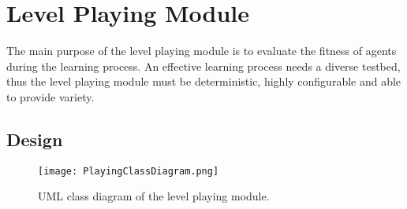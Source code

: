 
\section{Level Playing Module}

The main purpose of the level playing module is to evaluate the fitness of agents during the learning process. An effective learning process needs a diverse testbed, thus the level playing module must be deterministic, highly configurable and able to provide variety. 


\subsection{Design}

\begin{figure}[t]
	\centering
	\texttt{[image: PlayingClassDiagram.png]}
	\caption{UML class diagram of the level playing module.}
	\label{fig:pumlcd}
\end{figure}

